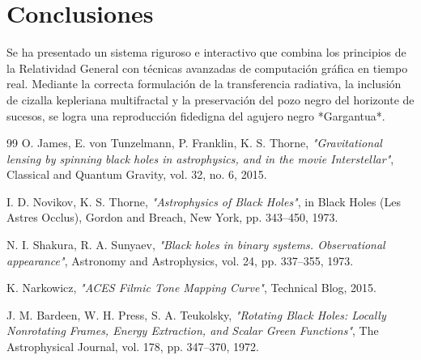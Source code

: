 \documentclass[10pt,twocolumn,a4paper]{article}
\begin{document}
\section{Conclusiones}
Se ha presentado un sistema riguroso e interactivo que combina los principios de la Relatividad General con técnicas avanzadas de computación gráfica en tiempo real. Mediante la correcta formulación de la transferencia radiativa, la inclusión de cizalla kepleriana multifractal y la preservación del pozo negro del horizonte de sucesos, se logra una reproducción fidedigna del agujero negro *Gargantua*.

\begin{thebibliography}{99}
O. James, E. von Tunzelmann, P. Franklin, K. S. Thorne, \textit{"Gravitational lensing by spinning black holes in astrophysics, and in the movie Interstellar"}, Classical and Quantum Gravity, vol. 32, no. 6, 2015.

I. D. Novikov, K. S. Thorne, \textit{"Astrophysics of Black Holes"}, in Black Holes (Les Astres Occlus), Gordon and Breach, New York, pp. 343--450, 1973.

N. I. Shakura, R. A. Sunyaev, \textit{"Black holes in binary systems. Observational appearance"}, Astronomy and Astrophysics, vol. 24, pp. 337--355, 1973.

K. Narkowicz, \textit{"ACES Filmic Tone Mapping Curve"}, Technical Blog, 2015.

J. M. Bardeen, W. H. Press, S. A. Teukolsky, \textit{"Rotating Black Holes: Locally Nonrotating Frames, Energy Extraction, and Scalar Green Functions"}, The Astrophysical Journal, vol. 178, pp. 347--370, 1972.
\end{thebibliography}
\end{document}
